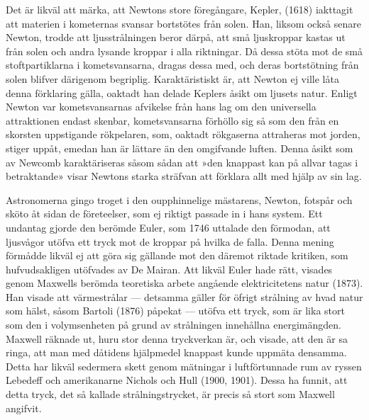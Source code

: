\documentclass[a4paper, 12pt, oneside, swedish]{article}
\begin{document}
Det är likväl att märka, att Newtons store föregångare, Kepler, (1618) iakttagit att materien i kometernas svansar bortstötes från solen. Han, liksom också senare Newton, trodde att ljusstrålningen beror därpå, att små ljuskroppar kastas ut från solen och andra lysande kroppar i alla riktningar. Då dessa stöta mot de små stoftpartiklarna i kometsvansarna, dragas dessa med, och deras bortstötning från solen blifver därigenom begriplig. Karaktäristiskt är, att Newton ej ville låta denna förklaring gälla, oaktadt han delade Keplers åsikt om ljusets natur. Enligt Newton var kometsvansarnas afvikelse från hans lag om den universella attraktionen endast skenbar, kometsvansarna förhöllo sig så som den från en skorsten uppstigande rökpelaren, som, oaktadt rökgaserna attraheras mot jorden, stiger uppåt, emedan han är lättare än den omgifvande luften. Denna åsikt som av Newcomb karaktäriseras såsom sådan att »den knappast kan på allvar tagas i betraktande» visar Newtons starka sträfvan att förklara allt med hjälp av sin lag.

Astronomerna gingo troget i den oupphinnelige mästarens, Newton, fotspår och sköto åt sidan de företeelser, som ej riktigt passade in i hans system. Ett undantag gjorde den berömde Euler, som 1746 uttalade den förmodan, att ljusvågor utöfva ett tryck mot de kroppar på hvilka de falla. Denna mening förmådde likväl ej att göra sig gällande mot den däremot riktade kritiken, som hufvudsakligen utöfvades av De Mairan. Att likväl Euler hade rätt, visades genom Maxwells berömda teoretiska arbete angående elektricitetens natur (1873). Han visade att värmestrålar --- detsamma gäller för öfrigt strålning av hvad natur som hälst, såsom Bartoli (1876) påpekat --- utöfva ett tryck, som är lika stort som den i volymsenheten på grund av strålningen innehållna energimängden. Maxwell räknade ut, huru stor denna tryckverkan är, och visade, att den är sa ringa, att man med dåtidens hjälpmedel knappast kunde uppmäta densamma. Detta har likväl sedermera skett genom mätningar i luftförtunnade rum av ryssen Lebedeff och amerikanarne Nichols och Hull (1900, 1901). Dessa ha funnit, att detta tryck, det så kallade strålningstrycket, är precis så stort som Maxwell angifvit.
\end{document}
